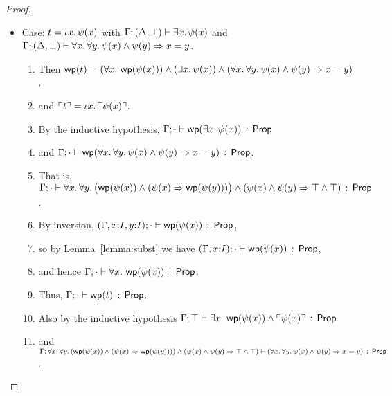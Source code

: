 \documentclass[10pt,a4paper]{article}
\begin{document}
\begin{proof}
\begin{itemize}
  \item Case: $t = \iota x.\, \psi(x)$ with
  $\Gamma;(\Delta,\bot) \vdash \exists x.\, \psi(x)$ and 
  $\Gamma;(\Delta,\bot) \vdash \forall x.\, \forall y.\, \psi(x) \wedge \psi(y) \Rightarrow x=y$.

    \begin{enumerate}
      \item 
        Then
        $\mathop{\mathsf{wp}}(t) = 
        (\forall x.\, \mathop{\mathsf{wp}}(\psi(x))) \wedge (\exists x.\, \psi(x)) \wedge (\forall x.\, \forall y.\, \psi(x) \wedge \psi(y) \Rightarrow x=y)$.
      \item
        and 
        	$\ulcorner t \urcorner = \iota x.\, \ulcorner \psi(x) \urcorner$.
      \item 
        By the inductive hypothesis, $\Gamma;\cdot \vdash \mathop{\mathsf{wp}}(\exists x.\, \psi(x))\, :\, \mathsf{Prop}$
      \item 
      	and
        $\Gamma;\cdot \vdash \mathop{\mathsf{wp}}(\forall x.\, \forall y.\, \psi(x) \wedge \psi(y) \Rightarrow x=y)\, :\, \mathsf{Prop}$.
      \item
      	That is, 
	$\Gamma;\cdot \vdash \forall x.\, \forall y.\, \bigl(\mathop{\mathsf{wp}}(\psi(x)) \wedge (\psi(x) \Rightarrow \mathop{\mathsf{wp}}(\psi(y)))\bigr) \wedge (\psi(x) \wedge \psi(y) \Rightarrow \top \wedge \top)\, :\, \mathsf{Prop}$.
	  \item
	    By inversion, 
	      $(\Gamma,x{:}I,y{:}I);\cdot \vdash \mathop{\mathsf{wp}}(\psi(x))\, :\, \mathsf{Prop}$,
      \item 
        so by Lemma~\ref{lemma:subst} we have 
        $(\Gamma,x{:}I);\cdot \vdash \mathop{\mathsf{wp}}(\psi(x))\, :\, \mathsf{Prop}$,
      \item
        and hence $\Gamma;\cdot \vdash \forall x.\, \mathop{\mathsf{wp}}(\psi(x))\, :\, \mathsf{Prop}$.
      \item
        Thus, $\Gamma;\cdot \vdash \mathop{\mathsf{wp}}(t)\, :\, \mathsf{Prop}$.
      \item
        Also by the inductive hypothesis
        $\Gamma;\top \vdash \exists x.\, \mathop{\mathsf{wp}}(\psi(x)) \wedge \ulcorner \psi(x) \urcorner\, :\, \mathsf{Prop}$
      \item
        and 
        $\Gamma;\forall x.\, \forall y.\, (\mathop{\mathsf{wp}}(\psi(x)) \wedge (\psi(x) \Rightarrow \mathop{\mathsf{wp}}(\psi(y)))) \wedge (\psi(x) \wedge \psi(y) \Rightarrow \top \wedge \top) \vdash (\forall x.\, \forall y.\, \psi(x) \wedge \psi(y) \Rightarrow x=y)\, :\, \mathsf{Prop}$.
      \end{enumerate}
      

\end{itemize}
\end{proof}
\end{document}
